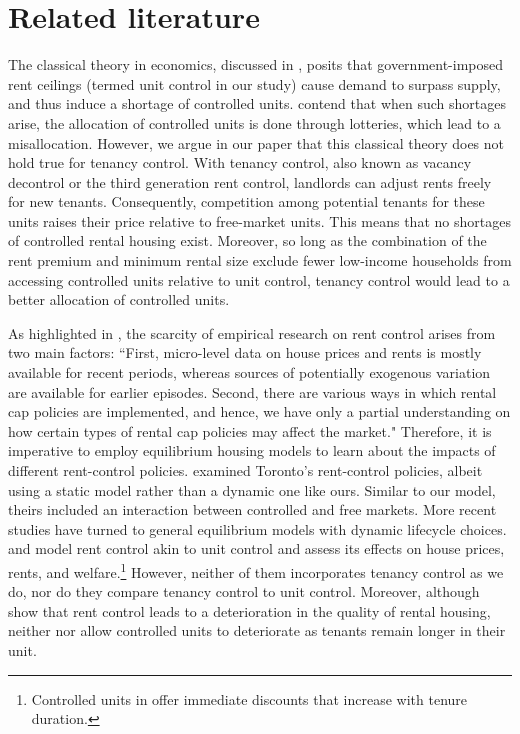 \documentclass[parskip=full]{article}
\begin{document}
\section{Related literature}\label{sec:related_lit}

The classical theory in economics, discussed in \citet{suen-1989}, posits that government-imposed rent ceilings (termed unit control in our study) cause demand to surpass supply, and thus induce a shortage of controlled units. \citet{gl-2003} contend that when such shortages arise, the allocation of controlled units is done through lotteries, which lead to a misallocation. However, we argue in our paper that this classical theory does not hold true for tenancy control. With tenancy control, also known as vacancy decontrol or the third generation rent control, landlords can adjust rents freely for new tenants. Consequently, competition among potential tenants for these units raises their price relative to free-market units. This means that no shortages of controlled rental housing exist. Moreover, so long as the combination of the rent premium and minimum rental size exclude fewer low-income households from accessing controlled units relative to unit control, tenancy control would lead to a better allocation of controlled units. 

As highlighted in \citet{mm-2023}, the scarcity of empirical research on rent control arises from two main factors: ``First, micro-level data on house prices and rents is mostly available for recent periods, whereas sources of potentially exogenous variation are available for earlier episodes. Second, there are various ways in which rental cap policies are implemented, and hence, we have only a partial understanding on how certain types of rental cap policies may affect the market." Therefore, it is imperative to employ equilibrium housing models to learn about the impacts of different rent-control policies. \citet{fallis-1985} examined Toronto's rent-control policies, albeit using a static model rather than a dynamic one like ours. Similar to our model, theirs included an interaction between controlled and free markets. More recent studies have turned to general equilibrium models with dynamic lifecycle choices. \citet{eric-1995} and \citet{fmn-2023} model rent control akin to unit control and assess its effects on house prices, rents, and welfare.\footnote{Controlled units in \citet{fmn-2023} offer immediate discounts that increase with tenure duration.} However, neither of them incorporates tenancy control as we do, nor do they compare tenancy control to unit control. Moreover, although \citet{ms-1993} show that rent control leads to a deterioration in the quality of rental housing, neither \citet{eric-1995} nor \citet{fmn-2023} allow controlled units to deteriorate as tenants remain longer in their unit.
\end{document}
